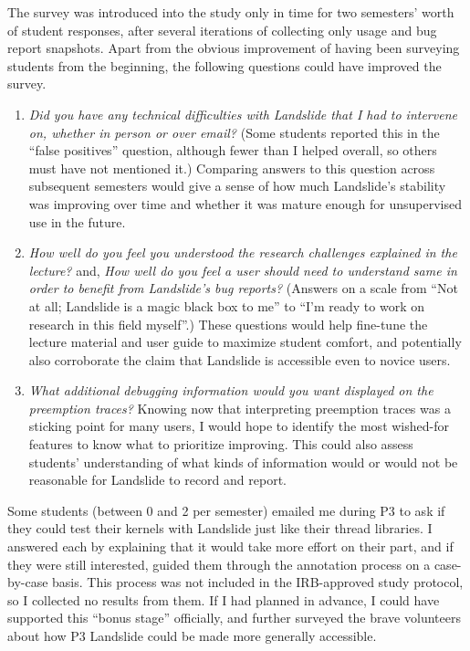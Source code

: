 The survey was introduced into the study only in time for two semesters' worth of student responses,
after several iterations of collecting only usage and bug report snapshots.
Apart from the obvious improvement of having been surveying students from the beginning,
the following questions could have improved the survey.
\begin{enumerate}
	\item {\em Did you have any technical difficulties with Landslide that I had to intervene on,
		whether in person or over email?}
		(Some students reported this in the ``false positives'' question,
		although fewer than I helped overall, so others must have not mentioned it.)
		Comparing answers to this question across subsequent semesters would give a sense
		of how much Landslide's stability was improving over time
		and whether it was mature enough for unsupervised use in the future.
	\item {\em How well do you feel you understood the research challenges explained in the lecture?}
		and,
		{\em How well do you feel a user should need to understand same in order to benefit from Landslide's bug reports?}
		(Answers on a scale from ``Not at all; Landslide is a magic black box to me''
		to ``I'm ready to work on research in this field myself''.)
		These questions would help fine-tune the lecture material and user guide to maximize student comfort,
		and potentially also corroborate the claim that Landslide is accessible even to novice users.
	\item {\em What additional debugging information would you want displayed on the preemption traces?}
		Knowing now that interpreting preemption traces was a sticking point for many users,
		I would hope to identify the most wished-for features to know what to prioritize improving.
		This could also assess students' understanding of what kinds of information
		would or would not be reasonable for Landslide to record and report.
\end{enumerate}

Some students (between 0 and 2 per semester)
emailed me during P3
to ask if they could test their kernels with Landslide just like their thread libraries.
I answered each by explaining that it would take more effort on their part,
and if they were still interested,
guided them through the annotation process on a case-by-case basis.
This process was not included in the IRB-approved study protocol,
so I collected no results from them.
If I had planned in advance, I could have supported this ``bonus stage'' officially,
and further surveyed the brave volunteers about how P3 Landslide could be made more generally accessible.

